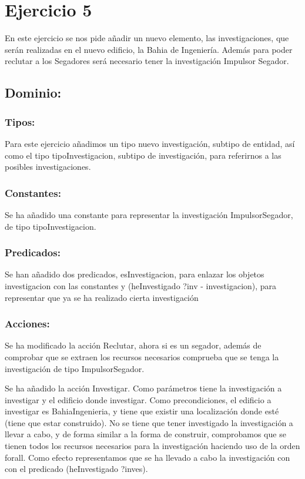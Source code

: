 \documentclass[10pt, spanish]{article}
\begin{document}
\section{Ejercicio 5}

En este ejercicio se nos pide añadir un nuevo elemento, las investigaciones, que serán realizadas en el nuevo edificio, la Bahia de Ingeniería. Además para poder reclutar a los Segadores será necesario tener la investigación Impulsor Segador.

\subsection{Dominio:}

\subsubsection{Tipos:}

Para este ejercicio añadimos un tipo nuevo investigación, subtipo de entidad, así como el tipo tipoInvestigacion, subtipo de investigación, para referirnos a las posibles investigaciones.

\subsubsection{Constantes:}

Se ha añadido una constante para representar la investigación ImpulsorSegador, de tipo tipoInvestigacion.

\subsubsection{Predicados:}

Se han añadido dos predicados, esInvestigacion, para enlazar los objetos investigacion con las constantes y (heInvestigado ?inv - investigacion), para representar que ya se ha realizado cierta investigación

\subsubsection{Acciones:}

Se ha modificado la acción Reclutar, ahora si es un segador, además de comprobar que se extraen los recursos necesarios comprueba que se tenga la investigación de tipo ImpulsorSegador.

Se ha añadido la acción Investigar. Como parámetros tiene la investigación a investigar y el edificio donde investigar. Como precondiciones, el edificio a investigar es BahiaIngenieria,  y tiene que existir una localización donde esté (tiene que estar construido). No se tiene que tener investigado la investigación a llevar a cabo, y de forma similar a la forma de construir, comprobamos que se tienen todos los recursos necesarios para la investigación haciendo uso de la orden forall. Como efecto representamos que se ha llevado a cabo la investigación con con el predicado (heInvestigado ?inves).
\end{document}
